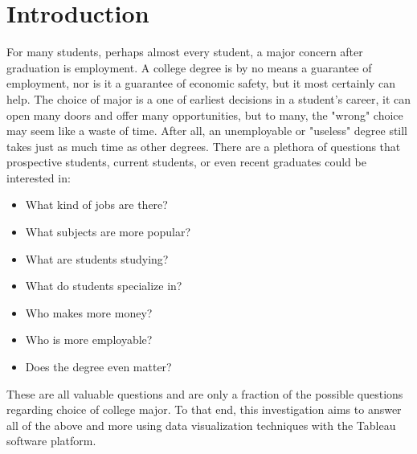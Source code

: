 \documentclass[sigchi]{acmart}
\begin{document}



\maketitle

\section{Introduction}

For many students, perhaps almost every student, a major concern after graduation is employment. A college degree is by no means a guarantee of employment, nor is it a guarantee of economic safety, but it most certainly can help. The choice of major is a one of earliest decisions in a student's career, it can open many doors and offer many opportunities, but to many, the "wrong" choice may seem like a waste of time. After all, an unemployable or "useless" degree still takes just as much time as other degrees. There are a plethora of questions that prospective students, current students, or even recent graduates could be interested in: 
\begin{itemize}
\item{What kind of jobs are there?}
\item{What subjects are more popular?}
\item{What are students studying?}
\item{What do students specialize in?}
\item{Who makes more money?}
\item{Who is more employable?}
\item{Does the degree even matter?}
\end{itemize}
These are all valuable questions and are only a fraction of the possible questions regarding choice of college major. To that end, this investigation aims to answer all of the above and more using data visualization techniques with the Tableau software platform.
\end{document}
